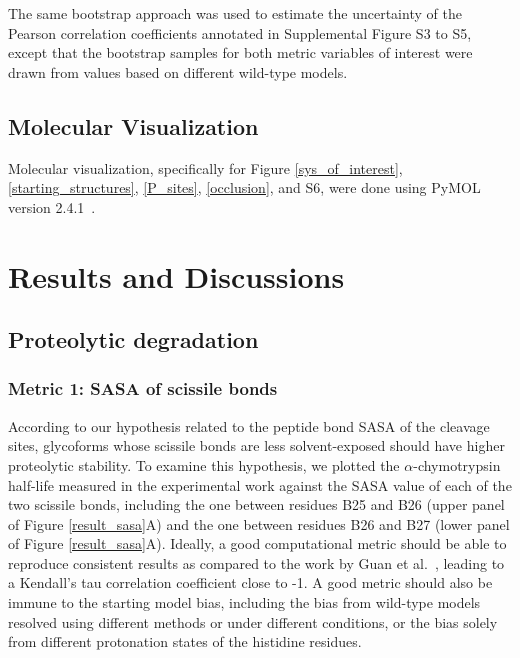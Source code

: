 \documentclass[sn-vancouver]{sn-jnl}
\begin{document}
The same bootstrap approach was used to estimate the uncertainty of the Pearson correlation coefficients annotated in Supplemental Figure S3 to S5, except that the bootstrap samples for both metric variables of interest were drawn from values based on different wild-type models.

\subsection{Molecular Visualization}
Molecular visualization, specifically for Figure \ref{sys_of_interest}, \ref{starting_structures}, \ref{P_sites}, \ref{occlusion}, and S6, were done using PyMOL version 2.4.1~\cite{delano2002pymol}.

\section{Results and Discussions}\label{results}
\subsection{Proteolytic degradation}
\subsubsection*{Metric 1: SASA of scissile bonds}
According to our hypothesis related to the peptide bond SASA of the cleavage sites, glycoforms whose scissile bonds are less solvent-exposed should have higher proteolytic stability. To examine this hypothesis, we plotted the $\alpha$-chymotrypsin half-life measured in the experimental work against the SASA value of each of the two scissile bonds, including the one between residues B25 and B26 (upper panel of Figure \ref{result_sasa}A) and the one between residues B26 and B27 (lower panel of Figure \ref{result_sasa}A). Ideally, a good computational metric should be able to reproduce consistent results as compared to the work by Guan et al.~\cite{guan2018chemically}, leading to a Kendall's tau correlation coefficient close to -1. A good metric should also be immune to the starting model bias, including the bias from wild-type models resolved using different methods or under different conditions, or the bias solely from different protonation states of the histidine residues. 
\end{document}
